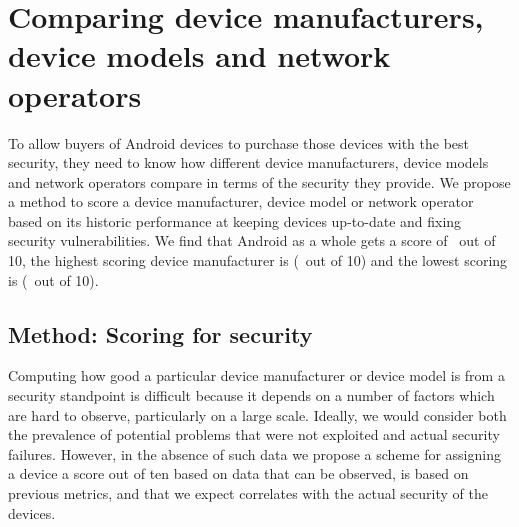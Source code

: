 \section{Comparing device manufacturers, device models and network operators}
\label{sec:security_scoring}\label{sec:exp:security_score}

To allow buyers of Android devices to purchase those devices with the best security, they need to know how different device manufacturers, device models and network operators compare in terms of the security they provide.
We propose a method to score a device manufacturer, device model or network operator based on its historic performance at keeping devices up-to-date and fixing security vulnerabilities.
We find that Android as a whole gets a score of \daSecurityScore\ out of 10, the highest scoring device manufacturer is \emph{\daSecScoreBestmanufacturer} (\daSecScoreBestmanufacturerScore\ out of 10) and the lowest scoring is \emph{\daSecScoreWorstmanufacturer} (\daSecScoreWorstmanufacturerScore\ out of 10).

\subsection{Method: Scoring for security}\label{sec:security_scoring:method}

Computing how good a particular device manufacturer or device model is from a security standpoint is difficult because it depends on a number of factors which are hard to observe, particularly on a large scale.
Ideally, we would consider both the prevalence of potential problems that were not exploited and actual security failures.
However, in the absence of such data we propose a scheme for assigning a device a score out of ten based on data that can be observed, is based on previous metrics, and that we expect correlates with the actual security of the devices.


